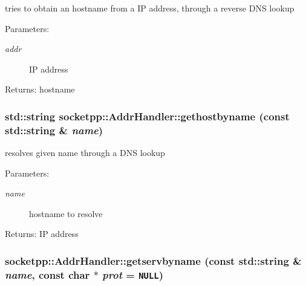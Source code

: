 tries to obtain an hostname from a IP address, through a reverse DNS lookup 

\begin{Desc}
\item[Parameters:]
\begin{description}
\item[{\em addr}]IP address \end{description}
\end{Desc}
\begin{Desc}
\item[Returns:]hostname \end{Desc}
\hypertarget{classsocketpp_1_1AddrHandler_19aebc1e9779dee4e5f06d7b39e18959}{
\subsubsection[{gethostbyname}]{\setlength{\rightskip}{0pt plus 5cm}std::string socketpp::AddrHandler::gethostbyname (const std::string \& {\em name})}}
\label{classsocketpp_1_1AddrHandler_19aebc1e9779dee4e5f06d7b39e18959}


resolves given name through a DNS lookup 

\begin{Desc}
\item[Parameters:]
\begin{description}
\item[{\em name}]hostname to resolve \end{description}
\end{Desc}
\begin{Desc}
\item[Returns:]IP address \end{Desc}
\hypertarget{classsocketpp_1_1AddrHandler_b4a42f2b0f3842d681ea0cbe6810d6ff}{
\subsubsection[{getservbyname}]{ socketpp::AddrHandler::getservbyname (const std::string \& {\em name}, \/  const char $\ast$ {\em prot} = {\tt NULL})}}
\label{classsocketpp_1_1AddrHandler_b4a42f2b0f3842d681ea0cbe6810d6ff}


